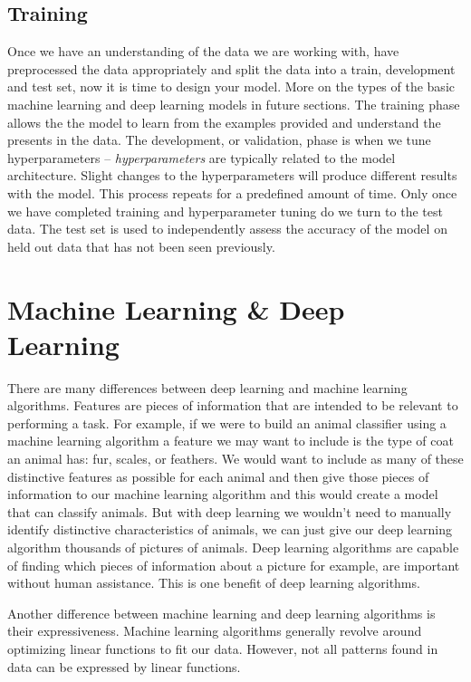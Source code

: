 \documentclass{article}
\begin{document}
\subsection{Training} 
Once we have an understanding of the data we are working with, have preprocessed the data appropriately and split the data into a train, development and test set, now it is time to design your model. More on the types of the basic machine learning and deep learning models in future sections. The training phase allows the the model to learn from the examples provided and understand the presents in the data. The development, or validation, phase is when we tune hyperparameters -- \textit{hyperparameters} are typically related to the model architecture. Slight changes to the hyperparameters will produce different results with the model. This process repeats for a predefined amount of time. Only once we have completed training and hyperparameter tuning do we turn to the test data. The test set is used to independently assess the accuracy of the model on held out data that has not been seen previously. 

\newpage
\section{Machine Learning \& Deep Learning} 
There are many differences between deep learning and machine learning algorithms. Features are pieces of information that are intended to be relevant to performing a task. For example, if we were to build an animal classifier using a machine learning algorithm a feature we may want to include is the type of coat an animal has: fur, scales, or feathers. We would want to include as many of these distinctive features as possible for each animal and then give those pieces of information to our machine learning algorithm and this would create a model that can classify animals. But with deep learning we wouldn't need to manually identify distinctive characteristics of animals, we can just give our deep learning algorithm thousands of pictures of animals. Deep learning algorithms are capable of finding which pieces of information about a picture for example, are important without human assistance. This is one benefit of deep learning algorithms.

Another difference between machine learning and deep learning algorithms is their expressiveness. Machine learning algorithms generally revolve around optimizing linear functions to fit our data. However, not all patterns found in data can be expressed by linear functions. 
\end{document}
